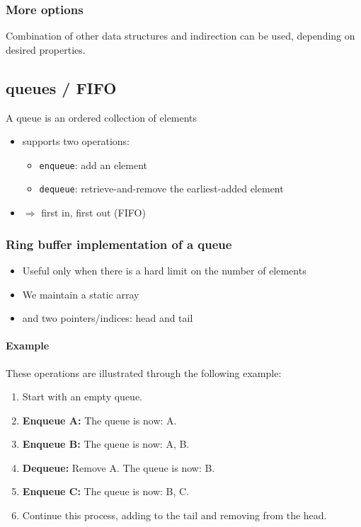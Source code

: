 \documentclass[12pt]{article}
\begin{document}
\subsubsection{More options}


Combination of other data structures and indirection can be used, depending on desired properties.

\subsection{queues / FIFO}

A queue is an ordered collection of elements
\begin{itemize}
    \item supports two operations:
    \begin{itemize}
        \item \texttt{enqueue}: add an element
        \item \texttt{dequeue}: retrieve-and-remove the earliest-added element
    \end{itemize}
    \item $\Rightarrow$ first in, first out (FIFO)
\end{itemize}

\subsubsection{Ring buffer implementation of a queue}
\begin{itemize}
    \item Useful only when there is a hard limit on the number of elements
    \item We maintain a static array
    \item and two pointers/indices: head and tail
\end{itemize}

\paragraph{Example}
These operations are illustrated through the following example:

\begin{enumerate}
    \item Start with an empty queue.
    \item \textbf{Enqueue A:} The queue is now: A.
    \item \textbf{Enqueue B:} The queue is now: A, B.
    \item \textbf{Dequeue:} Remove A. The queue is now: B.
    \item \textbf{Enqueue C:} The queue is now: B, C.
    \item Continue this process, adding to the tail and removing from the head.
\end{enumerate}
\end{document}
